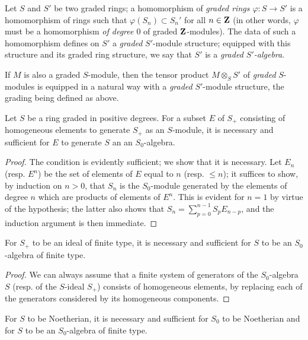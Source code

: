 \begin{env}[2.1.2]
Let $S$ and $S'$ be two graded rings;
a homomorphism of \emph{graded rings $\varphi:S\to S'$} is a homomorphism of rings such that $\varphi(S_n)\subset S_n'$ for all $n\in\mathbf{Z}$ (in other words, $\varphi$ must be a homomorphism \emph{of degree $0$} of graded $\mathbf{Z}$-modules).
The data of such a homomorphism defines on $S'$ a \emph{graded} $S'$-module structure;
equipped with this structure and its graded ring structure, we say that $S'$ is a \emph{graded $S'$-algebra}.

If $M$ is also a graded $S$-module, then the tensor product $M\otimes_S S'$ of \emph{graded} $S$-modules is equipped in a natural way with a \emph{graded} $S'$-module structure, the grading being defined as above.
\end{env}

\begin{lemma}[2.1.3]
\label{II.2.1.3}
Let $S$ be a ring graded in positive degrees.
For a subset $E$ of $S_+$ consisting of homogeneous elements to generate $S_+$ as an $S$-module, it is necessary and sufficient for $E$ to generate $S$ an an $S_0$-algebra.
\end{lemma}

\begin{proof}
The condition is evidently sufficient; we show that it is necessary.
Let $E_n$ (resp. $E^n$) be the set of elements of $E$ equal to $n$ (resp. $\leq n$);
it suffices to show, by induction on $n>0$, that $S_n$ is the $S_0$-module generated by the elements of degree $n$ which are products of elements of $E^n$.
This is evident for $n=1$ by virtue of the hypothesis;
the latter also shows that $S_n=\sum_{p=0}^{n-1}S_p E_{n-p}$, and the induction argument is then immediate.
\end{proof}

\begin{corollary}[2.1.4]
\label{II.2.1.4}
For $S_+$ to be an ideal of finite type, it is necessary and sufficient for $S$ to be an $S_0$-algebra of finite type.
\end{corollary}

\begin{proof}
We can always assume that a finite system of generators of the $S_0$-algebra $S$ (resp. of the $S$-ideal $S_+$) consists of homogeneous elements, by replacing each of the generators considered by its homogeneous components.
\end{proof}

\begin{corollary}[2.1.5]
\label{II.2.1.5}
For $S$ to be Noetherian, it is necessary and sufficient for $S_0$ to be Noetherian and for $S$ to be an $S_0$-algebra of finite type.
\end{corollary}

